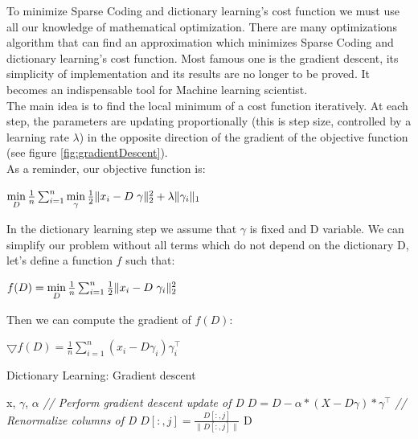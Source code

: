 To minimize Sparse Coding and dictionary learning's cost function we must use all our knowledge of mathematical optimization. There are many optimizations algorithm that can find an approximation which minimizes Sparse Coding and dictionary learning's cost function. Most famous one is the gradient descent, its simplicity of implementation and its results are no longer to be proved. It becomes an indispensable tool for Machine learning scientist.\\
The main idea is to find the local minimum of a cost function iteratively. At each step, the parameters are updating proportionally (this is step size, controlled by a learning rate $\lambda$) in the opposite direction of the gradient of the objective function (see figure \ref{fig:gradientDescent}).\\
As a reminder, our objective function is:
\begin{center}
 $\min\limits_{D} \frac{1}{n} \sum_{i=1}^{n}  \min\limits_{\gamma} \frac{1}{2} \| x_i - D \hspace{3px} \gamma \|_2^2 + \lambda \|\gamma_i \|_1$\\
\end{center}
In the dictionary learning step we assume that $\gamma$ is fixed and D variable. We can simplify our problem without all terms which do not depend on the dictionary D, let's define a function $f$ such that:
\begin{center}
 $f(D) = \min\limits_{D} \frac{1}{n} \sum_{i=1}^{n}\frac{1}{2} \| x_i- D \hspace{3px} \gamma_i \|_2^2 $\\
\end{center}
Then we can compute the gradient of $f(D)$:

\begin{center}
 $\bigtriangledown f(D) = \frac{1}{n} \sum_{i=1}^n (x_i -D \gamma_i)\gamma_i^{\intercal}$
\end{center}

\begin{algorithm}
\caption{Dictionary Learning: Gradient descent}
 \begin{algorithmic}
  \REQUIRE x, $\gamma$, $\alpha$
        \STATE \textit{// Perform gradient descent update of D}
        \STATE $D = D - \alpha * (X-D\gamma)*\gamma^{\intercal}$
        \STATE \textit{// Renormalize columns of D}
            \STATE $D[:,j] = \frac{D[:,j]}{\|D[:,j]\|}$
        \ENDFOR
  \ENDWHILE
  \RETURN D
 \end{algorithmic}
\end{algorithm}

